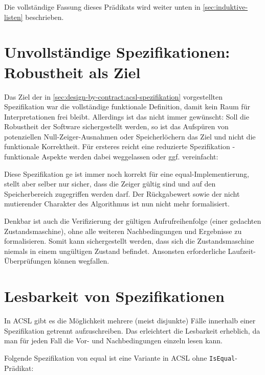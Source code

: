 Die vollständige Fassung dieses Prädikats wird weiter unten in \ref{sec:induktive-listen} beschrieben.



\section{Unvollständige Spezifikationen: Robustheit als Ziel}
\label{sec:design-by-contract:partielle-korrektheit}

Das Ziel der in \ref{sec:design-by-contract:acsl-spezifikation} vorgestellten Spezifikation war die
vollständige funktionale Definition, damit kein Raum für Interpretationen frei bleibt. Allerdings ist
das nicht immer gewünscht: Soll die Robustheit der Software sichergestellt werden, so ist das Aufspüren 
von potenziellen Null-Zeiger-Ausnahmen oder Speicherlöchern das Ziel und nicht die funktionale
Korrektheit. Für ersteres reicht eine reduzierte Spezifikation - funktionale Aspekte werden dabei 
weggelassen oder ggf. vereinfacht:


 
Diese Spezifikation ge ist immer noch korrekt für eine equal-Implementierung, stellt aber selber nur sicher,
dass die Zeiger gültig sind und auf den Speicherbereich zugegriffen werden darf. Der Rückgabewert sowie 
der nicht mutierender Charakter des Algorithmus ist nun nicht mehr formalisiert.

Denkbar ist auch die Verifizierung der gültigen Aufrufreihenfolge (einer gedachten Zustandsmaschine),
ohne alle weiteren Nachbedingungen und Ergebnisse zu formalisieren. Somit kann sichergestellt werden,
dass sich die Zustandsmaschine niemals in einem ungültigen Zustand befindet. Ansonsten erforderliche
Laufzeit-Überprüfungen können wegfallen.



\section{Lesbarkeit von Spezifikationen}
\label{sec:design-by-contract:behaviors}

In ACSL gibt es die Möglichkeit mehrere (meist disjunkte) Fälle innerhalb einer Spezifikation getrennt
aufzuschreiben. Das erleichtert die Lesbarkeit erheblich, da man für jeden Fall die Vor- und Nachbedingungen
einzeln lesen kann.

Folgende Spezifikation von equal ist eine Variante in ACSL ohne \lstinline{IsEqual}-Prädikat:

